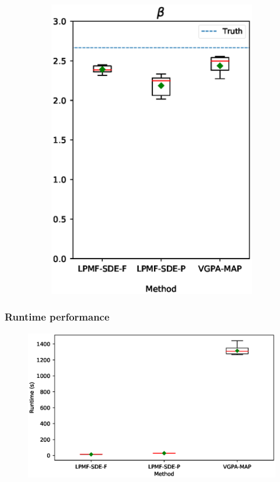\begin{frame}[t]
\begin{figure}
\begin{subfigure}{0.24\textwidth}
            \includegraphics[width=\linewidth]{graphics/lorenz-63-parameters-beta-boxplot}
            \label{fig-lorenz-63-parameters-beta-boxplot}
        \end{subfigure}
        \label{fig-lorenz-63-parameters-group}
    \end{figure}    
\end{frame}

\begin{frame}[t]
    \frametitle{Runtime performance}
    \begin{figure}
        \centering
        \includegraphics[width=0.7\linewidth]{graphics/lorenz-63-runtime-boxplot}
        \label{fig-lorenz-63-runtime-boxplot}    
    \end{figure}
\end{frame}